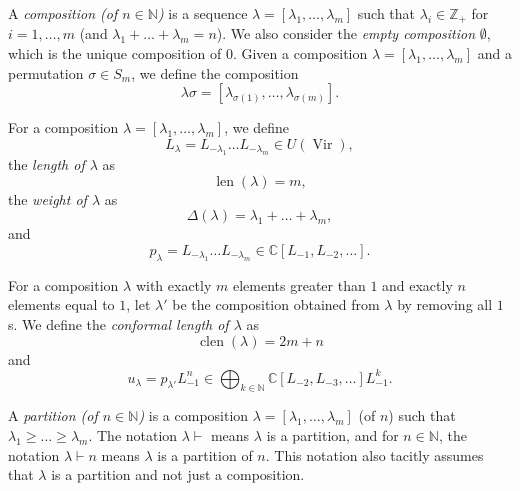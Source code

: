 \documentclass[a4paper, 12pt, reqno]{amsart}
\theoremstyle{remark}
\DeclareMathOperator{\Vir}{Vir}
\DeclareMathOperator{\len}{len}
\DeclareMathOperator{\clen}{clen}
\begin{document}
A \emph{composition (of $n \in \mathbb{N}$)} is a sequence $\lambda = [\lambda_1, \dots, \lambda_m]$ such that $\lambda_i \in \mathbb{Z}_+$ for $i = 1, \dots, m$ (and $\lambda_1 + \dots + \lambda_m = n$).
We also consider the \emph{empty composition} $\emptyset$, which is the unique composition of $0$.
Given a composition $\lambda = [\lambda_1, \dots, \lambda_m]$ and a permutation $\sigma \in S_m$, we define the composition
\begin{equation*}
  \lambda\sigma = [\lambda_{\sigma(1)}, \dots, \lambda_{\sigma(m)}].
\end{equation*}

For a composition $\lambda = [\lambda_1, \dots, \lambda_m]$, we define
\begin{equation*}
  L_{\lambda} = L_{-\lambda_1}\dots L_{-\lambda_m} \in U(\Vir),
\end{equation*}
the \emph{length of $\lambda$} as
\begin{equation*}
  \len(\lambda) = m,
\end{equation*}
the \emph{weight of $\lambda$} as
\begin{equation*}
  \Delta(\lambda) = \lambda_1 + \dots + \lambda_m,
\end{equation*}
and
\begin{equation*}
  p_{\lambda} = L_{-\lambda_1}\dots L_{-\lambda_m} \in \mathbb{C}[L_{-1}, L_{-2}, \dots].
\end{equation*}

For a composition $\lambda$ with exactly $m$ elements greater than $1$ and exactly $n$ elements equal to $1$, let $\lambda'$ be the composition obtained from $\lambda$ by removing all $1$s.
We define the \emph{conformal length of $\lambda$} as
\begin{equation*}
  \clen(\lambda) = 2m + n
\end{equation*}
and
\begin{equation*}
  u_{\lambda} = p_{\lambda'}L_{-1}^n \in \bigoplus_{k \in \mathbb{N}}\mathbb{C}[L_{-2}, L_{-3}, \dots]L_{-1}^k.
\end{equation*}

A \emph{partition (of $n \in \mathbb{N}$)} is a composition $\lambda = [\lambda_1, \dots, \lambda_m]$ (of $n$) such that $\lambda_1 \ge \dots \ge \lambda_m$.
The notation $\lambda \vdash$ means $\lambda$ is a partition, and for $n \in \mathbb{N}$, the notation $\lambda \vdash n$ means $\lambda$ is a partition of $n$.
This notation also tacitly assumes that $\lambda$ is a partition and not just a composition.
\end{document}
